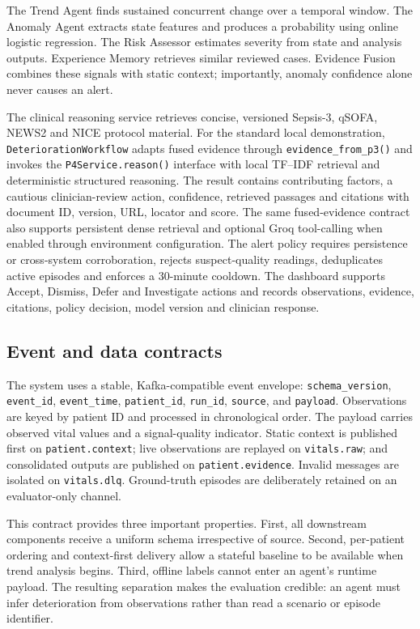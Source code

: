 \documentclass[11pt,a4paper]{article}
\begin{document}
The Trend Agent finds sustained concurrent change over a temporal window. The Anomaly Agent extracts state features and produces a probability using online logistic regression. The Risk Assessor estimates severity from state and analysis outputs. Experience Memory retrieves similar reviewed cases. Evidence Fusion combines these signals with static context; importantly, anomaly confidence alone never causes an alert.

The clinical reasoning service retrieves concise, versioned Sepsis-3, qSOFA, NEWS2 and NICE protocol material. For the standard local demonstration, \texttt{DeteriorationWorkflow} adapts fused evidence through \texttt{evidence\_from\_p3()} and invokes the \texttt{P4Service.reason()} interface with local TF--IDF retrieval and deterministic structured reasoning. The result contains contributing factors, a cautious clinician-review action, confidence, retrieved passages and citations with document ID, version, URL, locator and score. The same fused-evidence contract also supports persistent dense retrieval and optional Groq tool-calling when enabled through environment configuration. The alert policy requires persistence or cross-system corroboration, rejects suspect-quality readings, deduplicates active episodes and enforces a 30-minute cooldown. The dashboard supports Accept, Dismiss, Defer and Investigate actions and records observations, evidence, citations, policy decision, model version and clinician response.

\subsection{Event and data contracts}
The system uses a stable, Kafka-compatible event envelope: \texttt{schema\_version}, \texttt{event\_id}, \texttt{event\_time}, \texttt{patient\_id}, \texttt{run\_id}, \texttt{source}, and \texttt{payload}. Observations are keyed by patient ID and processed in chronological order. The payload carries observed vital values and a signal-quality indicator. Static context is published first on \texttt{patient.context}; live observations are replayed on \texttt{vitals.raw}; and consolidated outputs are published on \texttt{patient.evidence}. Invalid messages are isolated on \texttt{vitals.dlq}. Ground-truth episodes are deliberately retained on an evaluator-only channel.

This contract provides three important properties. First, all downstream components receive a uniform schema irrespective of source. Second, per-patient ordering and context-first delivery allow a stateful baseline to be available when trend analysis begins. Third, offline labels cannot enter an agent's runtime payload. The resulting separation makes the evaluation credible: an agent must infer deterioration from observations rather than read a scenario or episode identifier.
\end{document}
